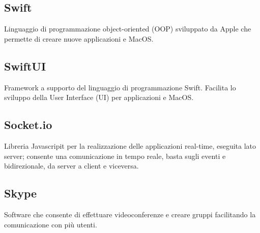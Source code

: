 \subsection*{Swift}
Linguaggio di programmazione object-oriented (OOP) sviluppato da Apple che permette di creare nuove applicazioni  e MacOS.  
\subsection*{SwiftUI}
Framework a supporto del linguaggio di programmazione Swift. Facilita lo sviluppo della User Interface (UI) per applicazioni  e MacOS.
\subsection*{Socket.io}
Libreria Javascripit per la realizzazione delle applicazioni real-time, eseguita lato server; consente una comunicazione in tempo reale, basta sugli eventi e bidirezionale, da server a client e viceversa. 

\subsection*{Skype}
Software che consente di effettuare videoconferenze e creare gruppi facilitando la comunicazione con più utenti.